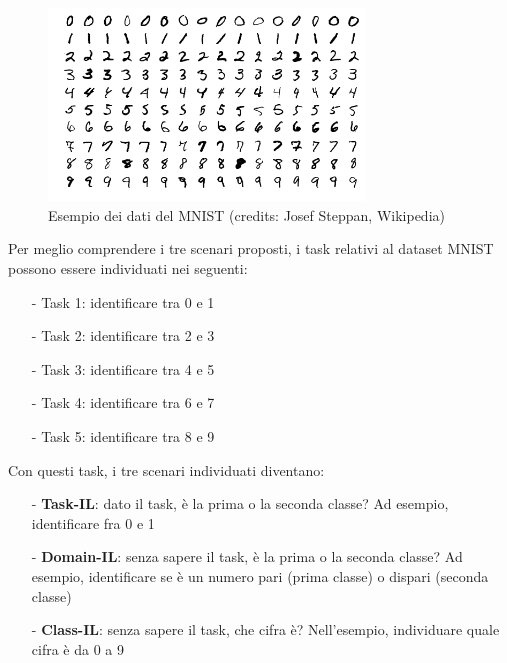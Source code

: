\begin{figure}[h]
	\begin{center}
		\includegraphics[width=0.75\textwidth]{img/MnistExamples.png}
		\caption{Esempio dei dati del MNIST (credits: Josef Steppan, Wikipedia)}
		\label{fig:mnistexamples}
	\end{center}
\end{figure}
Per meglio comprendere i tre scenari proposti, i task relativi al dataset MNIST possono essere individuati nei seguenti:
\begin{itemize}
    \item[-] Task 1: identificare tra 0 e 1
    \item[-] Task 2: identificare tra 2 e 3
    \item[-] Task 3: identificare tra 4 e 5
    \item[-] Task 4: identificare tra 6 e 7
    \item[-] Task 5: identificare tra 8 e 9
\end{itemize}
Con questi task, i tre scenari individuati diventano:
\begin{itemize}
    \item[-] \textbf{Task-IL}: dato il task, è la prima o la seconda classe? Ad esempio, identificare fra 0 e 1
    \item[-] \textbf{Domain-IL}: senza sapere il task, è la prima o la seconda classe? Ad esempio, identificare se è un numero pari (prima classe) o dispari (seconda classe)
    \item[-] \textbf{Class-IL}: senza sapere il task, che cifra è? Nell'esempio, individuare quale cifra è da 0 a 9
\end{itemize}
